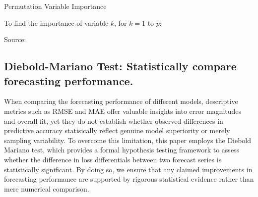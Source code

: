 \begin{algorithm}[H]
    \caption{Permutation Variable Importance}
    \label{alg:fi}
    
    To find the importance of variable $k$, for $k = 1$ to $p$:
    
    Source: \cite{cutler_2012}
    \end{algorithm}


\subsection{Diebold-Mariano Test: Statistically compare forecasting performance.}

When comparing the forecasting performance of different models, descriptive metrics such as RMSE and MAE offer valuable insights into error magnitudes and overall fit, yet they do not establish whether observed differences in predictive accuracy statisically reflect genuine model superiority or merely sampling variability. To overcome this limitation, this paper employs the Diebold Mariano test, which provides a formal hypothesis testing framework to assess whether the difference in loss differentials between two forecast series is statistically significant. By doing so, we ensure that any claimed improvements in forecasting performance are supported by rigorous statistical evidence rather than mere numerical comparison.


